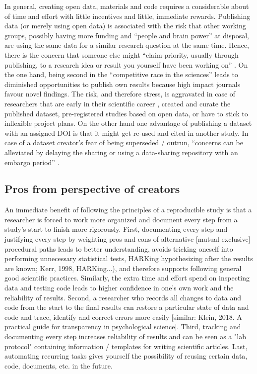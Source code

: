 In general, creating open data, materials and code requires a considerable about
of time and effort with little incentives and little, immediate rewards.
%
Publishing data (or merely using open data) is associated with the risk that
other working groups, possibly having more funding and ``people and brain
power'' at disposal, are using the same data for a similar research question at
the same time.
%
Hence, there is the concern that someone else might ``claim priority, usually
through publishing, to a research idea or result you yourself have been working
on'' \citep{laine2017afraid}.
%
On the one hand, being second in the ``competitive race in the sciences'' leads
to diminished opportunities to publish own results because high impact journals
favour novel findings.
%
The risk, and therefore stress, is aggravated in case of researchers that are
early in their scientific career \citep[cf.][]{toribio2021early}, created and
curate the published dataset, pre-registered studies based on open data, or have
to stick to inflexible project plans.
%
On the other hand one advantage of publishing a dataset with an assigned DOI is
that it might get re-used and cited in another study.
%
In case of a dataset creator's fear of being superseded / outrun, ``concerns can
be alleviated by delaying the sharing or using a data-sharing repository with an
embargo period'' \citep{nichols2017best}.


\subsection{Pros from perspective of creators}

An immediate benefit of following the principles of a reproducible study is that
a researcher is forced to work more organized and document every step from a
study's start to finish more rigorously.
%
First, documenting every step and justifying every step by weighting pros and
cons of alternative [mutual exclusive] procedural paths leads to better
understanding, avoids tricking oneself into performing unnecessary statistical
tests, HARKing hypothesizing after the results are known; Kerr, 1998,
HARKing...), and therefore supports following general good scientific practices.
%
Similarly, the extra time and effort spend on inspecting data and testing code
leads to higher confidence in one's own work and the reliability of results.
%
Second, a researcher who records all changes to data and code from the start to
the final results can restore a particular state of data and code and trace,
identify and correct errors more easily [similar: Klein, 2018. A practical guide
for transparency in psychological science].
%
Third, tracking and documenting every step increases reliability of results and
can be seen as a "lab protocol" containing information / templates for writing
scientific articles.
%
Last, automating recurring tasks gives yourself the possibility of reusing
certain data, code, documents, etc. in the future.


